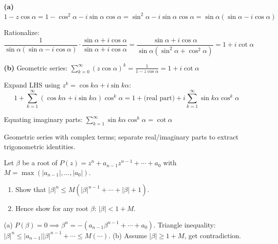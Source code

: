 \begin{solution}
\textbf{(a)} $1-z\cos\alpha = 1-\cos^2\alpha - i\sin\alpha\cos\alpha = \sin^2\alpha - i\sin\alpha\cos\alpha = \sin\alpha(\sin\alpha - i\cos\alpha)$

Rationalize:
$$
\frac{1}{\sin\alpha(\sin\alpha-i\cos\alpha)} \cdot \frac{\sin\alpha+i\cos\alpha}{\sin\alpha+i\cos\alpha} = \frac{\sin\alpha+i\cos\alpha}{\sin\alpha(\sin^2\alpha+\cos^2\alpha)} = 1+i\cot\alpha
$$

\textbf{(b)} Geometric series: $\sum_{k=0}^\infty (z\cos\alpha)^k = \frac{1}{1-z\cos\alpha} = 1+i\cot\alpha$

Expand LHS using $z^k = \cos k\alpha + i\sin k\alpha$:
$$
1 + \sum_{k=1}^\infty (\cos k\alpha + i\sin k\alpha)\cos^k\alpha = 1 + \text{(real part)} + i\sum_{k=1}^\infty \sin k\alpha \cos^k\alpha
$$

Equating imaginary parts: $\sum_{k=1}^\infty \sin k\alpha \cos^k\alpha = \cot\alpha$

\end{solution}

\begin{takeaways}
Geometric series with complex terms; separate real/imaginary parts to extract trigonometric identities.
\end{takeaways}

\vspace{1cm}

\begin{problem}
Let $\beta$ be a root of $P(z) = z^n + a_{n-1}z^{n-1} + \cdots + a_0$ with $M = \max(|a_{n-1}|, \ldots, |a_0|)$.
\begin{enumerate}
    \item Show that $|\beta|^n \le M(|\beta|^{n-1} + \cdots + |\beta| + 1)$.
    \item Hence show for any root $\beta$: $|\beta| < 1 + M$.
\end{enumerate}
\end{problem}

\vspace{0.5cm}
\begin{hintbox}
(a) $P(\beta)=0 \implies \beta^n = -(a_{n-1}\beta^{n-1}+\cdots+a_0)$. Triangle inequality: $|\beta|^n \le |a_{n-1}||\beta|^{n-1}+\cdots \le M(\cdots)$. (b) Assume $|\beta| \ge 1+M$, get contradiction.
\end{hintbox}

